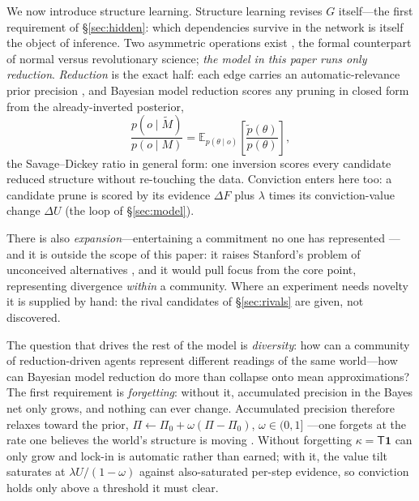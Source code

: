 \documentclass[runningheads]{llncs}
\newcommand{\Eq}[2]{\mathbb{E}_{#1}\!\left[#2\right]}
\newcommand{\Top}{\mathsf{T}}          %
\newcommand{\bone}{\mathbf{1}}         %
\begin{document}
\label{sec:structurelearning}%
We now introduce structure learning. Structure learning revises $G$ itself---the first
requirement of \S\ref{sec:hidden}: which dependencies survive in the network is itself the
object of inference. Two
asymmetric operations exist \citep{friston2017curiosity,smith2020structure}, the formal
counterpart of normal versus revolutionary science; \emph{the model in this paper runs only
reduction}. \emph{Reduction} is the exact half: each edge carries
an automatic-relevance prior precision \citep{mackay1992,tipping2001}, and Bayesian model
reduction \citep{friston2011,friston2018bmr} scores any pruning in closed form from the
already-inverted posterior,
\begin{equation}
\frac{p(o\mid\tilde M)}{p(o\mid M)}=\Eq{p(\theta\mid o)}{\frac{\tilde p(\theta)}{p(\theta)}},
\label{eq:bmr}
\end{equation}
the Savage--Dickey ratio in general form: one inversion scores every candidate reduced structure
without re-touching the data. Conviction enters here too: a candidate prune is scored by its
evidence $\Delta F$ plus $\lambda$ times its conviction-value change $\Delta U$ (the loop of
\S\ref{sec:model}).

There is also \emph{expansion}---entertaining a commitment no one has represented
\citep{friston2017curiosity}---and it is outside the scope of this paper: it raises Stanford's
problem of unconceived alternatives \citep{stanford2006}, and it would pull focus from the
core point, representing divergence \emph{within} a community. Where an experiment needs
novelty it is supplied by hand: the rival candidates of \S\ref{sec:rivals} are given, not
discovered.

\label{sec:temporal}%
The question that drives the rest of the model is \emph{diversity}: how can a community of
reduction-driven agents represent different readings of the same world---how can
Bayesian model reduction do more than collapse onto mean approximations? The first requirement
is \emph{forgetting}: without it, accumulated precision in the Bayes net only grows, and
nothing can ever change. Accumulated precision therefore relaxes toward the prior,
$\Pi\leftarrow\Pi_0+\omega(\Pi-\Pi_0)$, $\omega\in(0,1]$
\citep{friston2017process,smith2022tutorial}---one forgets at the rate one believes the world's
structure is moving \citep{mathys2011}. Without forgetting $\kappa=\Top\bone$ can only grow and lock-in
is automatic rather than earned; with it, the value tilt saturates at $\lambda U/(1-\omega)$
against also-saturated per-step evidence, so conviction holds only above a threshold it must
clear.
\end{document}
